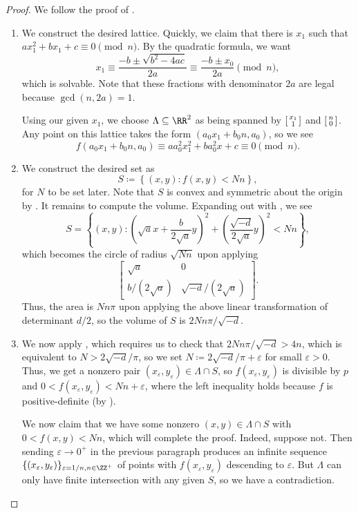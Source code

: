 \documentclass[../notes.tex]{subfiles}
\begin{document}
\begin{proof}
	We follow the proof of .
	\begin{enumerate}
		\item We construct the desired lattice. Quickly, we claim that there is $x_1$ such that $ax_1^2+bx_1+c\equiv0\pmod n$. By the quadratic formula, we want
		\[x_1\equiv\frac{-b\pm\sqrt{b^2-4ac}}{2a}\equiv\frac{-b\pm x_0}{2a}\pmod n,\]
		which is solvable. Note that these fractions with denominator $2a$ are legal because $\gcd(n,2a)=1$.
		
		Using our given $x_1$, we choose $\Lambda\subseteq\RR^2$ as being spanned by $\begin{bsmallmatrix}
			x_1 \\ 1
		\end{bsmallmatrix}$ and $\begin{bsmallmatrix}
			n \\ 0
		\end{bsmallmatrix}$. Any point on this lattice takes the form $(a_0x_1+b_0n,a_0)$, so we see
		\[f(a_0x_1+b_0n,a_0)\equiv aa_0^2x_1^2+ba_0^2x+c\equiv0\pmod n.\]

		\item We construct the desired set as
		\[S\coloneqq\left\{(x,y):f(x,y)<Nn\right\},\]
		for $N$ to be set later. Note that $S$ is convex and symmetric about the origin by . It remains to compute the volume. Expanding out with , we see
		\[S=\left\{(x,y):\left(\sqrt ax+\frac b{2\sqrt a}y\right)^2+\left(\frac{\sqrt{-d}}{2\sqrt a}y\right)^2<Nn\right\},\]
		which becomes the circle of radius $\sqrt{Nn}$ upon applying
		\[\begin{bmatrix}
			\sqrt a & 0 \\
			b/(2\sqrt a) & \sqrt{-d}/(2\sqrt a)
		\end{bmatrix}.\]
		Thus, the area is $Nn\pi$ upon applying the above linear transformation of determinant $d/2$, so the volume of $S$ is $2Nn\pi/\sqrt{-d}$.

		\item We now apply , which requires us to check that $2Nn\pi/\sqrt{-d}>4n$, which is equivalent to $N>2\sqrt{-d}/\pi$, so we set $N\coloneqq2\sqrt{-d}/\pi+\varepsilon$ for small $\varepsilon>0$. Thus, we get a nonzero pair $(x_\varepsilon,y_\varepsilon)\in\Lambda\cap S$, so $f(x_\varepsilon,y_\varepsilon)$ is divisible by $p$ and $0<f(x_\varepsilon,y_\varepsilon)<Nn+\varepsilon$, where the left inequality holds because $f$ is positive-definite (by ).

		We now claim that we have some nonzero $(x,y)\in\Lambda\cap S$ with $0<f(x,y)<Nn$, which will complete the proof. Indeed, suppose not. Then sending $\varepsilon\to0^+$ in the previous paragraph produces an infinite sequence $\{(x_\varepsilon,y_\varepsilon)\}_{\varepsilon=1/n,n\in\ZZ^+}$ of points with $f(x_\varepsilon,y_\varepsilon)$ descending to $\varepsilon$. But $\Lambda$ can only have finite intersection with any given $S$, so we have a contradiction.
		\qedhere
	\end{enumerate}
\end{proof}
\end{document}
